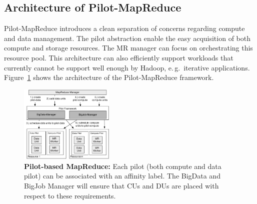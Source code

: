 \documentclass{acm_proc_article-sp}
\newcommand{\pilotmapreduce}{Pilot-MapReduce\xspace}
\begin{document}
\subsection{Architecture of Pilot-MapReduce}



Pilot-MapReduce introduces a clean separation of concerns regarding compute and data management. The
pilot abstraction enable the easy acquisition of both compute and storage
resources. The MR manager can focus on orchestrating this resource pool. This architecture can also efficiently support workloads that currently cannot be support well enough by Hadoop, e.\,g.\ iterative applications. Figure~\ref{fig:figures_mapreduce-pilotdata} shows the architecture of the
\pilotmapreduce framework.

\begin{figure}[htbp]
	\centering
	\includegraphics[width=0.4\textwidth]{figures/mapreduce-pilotdata.pdf}
	\caption{\textbf{Pilot-based MapReduce:} Each pilot (both compute and data 
	pilot) can be associated with an affinity label. The BigData and BigJob 
	Manager will ensure that CUs and DUs are placed with respect to these 
	requirements.}
	\label{fig:figures_mapreduce-pilotdata}
\end{figure}
\end{document}
